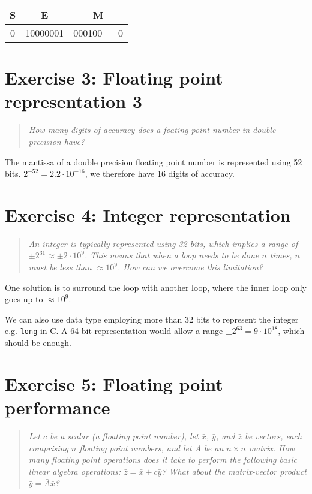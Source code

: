 \bigskip
\begin{center}
  \begin{tabular}{|c|c|c|}
    \hline
    S & E & M \\
    \hline
    0 & 10000001 & 000100 --- 0 \\
    \hline
  \end{tabular}
\end{center}

  
\section{Exercise 3: Floating point representation 3} %
\label{sec:exercise_3}
\begin{quotation}
  \emph{How many digits of accuracy does a foating point number in double precision have?
}
\end{quotation}
The mantissa of a double precision floating point number is represented using 52 bits. $2^{-52} = 2.2\cdot 10^{-16}$, we therefore have 16 digits of accuracy.


\section{Exercise 4: Integer representation} %
\label{sec:exercise_4}
\begin{quotation}
  \emph{An integer is typically represented using 32 bits, which implies a range of $\pm 2^{31} \approx \pm 2\cdot 10^9$. This means that when a loop needs to be done $n$ times, $n$ must be less than  $\approx 10^9$. How can we overcome this limitation?}
\end{quotation}

One solution is to surround the loop with another loop, where the inner loop only goes up to $\approx 10^9$.

We can also use data type employing more than 32 bits to represent the integer e.g. \texttt{long} in C. A 64-bit representation would allow a range $\pm 2^{63} = 9\cdot 10^18$, which should be enough.


\section{Exercise 5: Floating point performance} %
\label{sec:exercise_5}
\begin{quotation}
  \emph{ Let $c$ be a scalar (a floating point number), let $\bar{x}$, $\bar{y}$, and $\bar{z}$ be vectors, each comprising $n$  floating point numbers, and let $\bar{A}$ be an $n\times n$ matrix. How many floating point operations does it take to perform the following basic linear algebra operations: $\bar{z} = \bar{x} + c \bar{y}$? What about the matrix-vector product $\bar{y} = \bar{A}\bar{x}$?}
\end{quotation}

